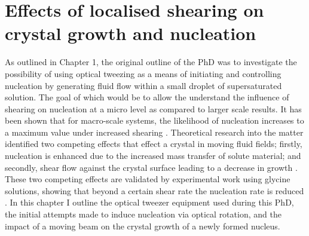 \chapter{Effects of localised shearing on crystal growth and nucleation}
As outlined in Chapter 1, the original outline of the PhD was to investigate the possibility of using optical tweezing as a means of initiating and controlling nucleation by generating fluid flow within a small droplet of supersaturated solution. The goal of which would be to allow the understand the influence of shearing on nucleation at a micro level as compared to larger scale results. It has been shown that for macro-scale systems, the likelihood of nucleation increases to a maximum value under increased shearing \cite{Debuysschere2023, Mura2016}. Theoretical research into the matter identified two competing effects that effect a crystal in moving fluid fields; firstly, nucleation is enhanced due to the increased mass transfer of solute material; and secondly, shear flow against the crystal surface leading to a decrease in growth \cite{Mura2016}. These two competing effects are validated by experimental work using glycine solutions, showing that beyond a certain shear rate the nucleation rate is reduced \cite{Debuysschere2023}. In this chapter I outline the optical tweezer equipment used during this PhD, the initial attempts made to induce nucleation via optical rotation, and the impact of a moving beam on the crystal growth of a newly formed nucleus. 

